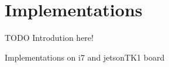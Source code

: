 \chapter{Implementations}
\label{chapter:implementations}

TODO Introdution here!

Implementations on i7 and jetsonTK1 board





